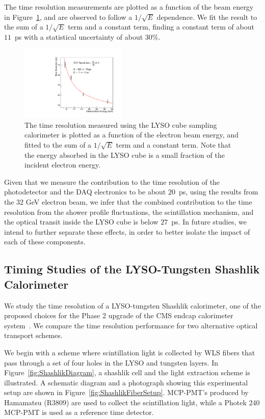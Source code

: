 \documentclass[12pt]{article}
\begin{document}
The time resolution measurements are plotted as a function of the
beam energy in Figure~\ref{fig:LYSOCubeTOFResolutionVsEnergy}, and are observed
to follow a $1/\sqrt{E}$ dependence. We fit the result to the sum of a 
$1/\sqrt{E}$ term and a constant term, finding a constant term of
about $11$~ps with a statistical uncertainty of about $30\%$. 

\begin{figure}[h] \centering
\includegraphics[width=0.45\textwidth]{figs/TimeResolutionVsEnergy_CrystalCube} 
\caption{ The time resolution measured using the LYSO cube
sampling calorimeter is plotted as a function of the electron beam energy, 
and fitted to the sum of a $1/\sqrt{E}$ term and a constant term. Note that the energy absorbed in the LYSO cube is a small fraction of the incident electron energy.}
\label{fig:LYSOCubeTOFResolutionVsEnergy}
\end{figure}

Given that we measure the contribution to the time resolution of the
photodetector and the DAQ electronics to be about $20$~ps, using the results from
the 32 GeV electron beam, we infer that the
combined contribution to the time resolution from the shower profile
fluctuations, the scintillation mechanism, and the optical transit inside the
LYSO cube is below $27$~ps. In future studies, we intend to further separate these
effects, in order to better isolate the impact of each of these components.

\subsection{Timing Studies of the LYSO-Tungsten Shashlik Calorimeter}

We study the time resolution of a LYSO-tungsten Shashlik calorimeter, one of the
proposed choices for the Phase 2 upgrade of the CMS endcap calorimeter
system~\cite{Contardo:1605208}. We compare the time resolution performance for
two alternative optical transport schemes. 

We begin with a scheme where scintillation light is collected by WLS fibers that
pass through a set of four holes in the LYSO and tungsten layers. In 
Figure~\ref{fig:ShashlikDiagram}, a shashlik cell and the light extraction 
scheme is illustrated. A schematic diagram and a photograph showing this experimental
setup are shown in Figure~\ref{fig:ShashlikFiberSetup}. MCP-PMT's produced by 
Hamamatsu (R3809) are used to collect the scintillation light, while a Photek 240 
MCP-PMT is used as a reference time detector. 
\end{document}
